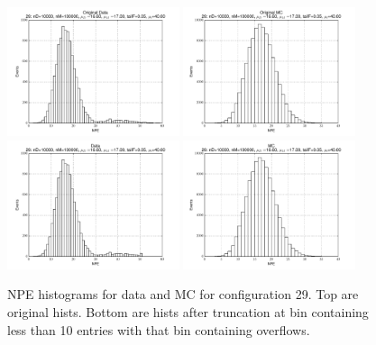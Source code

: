  \begin{figure}[htbp] \begin{center} 
\includegraphics[width=0.45\textwidth]{../FIGURES/29/FIG_Original_Data.pdf} 
\includegraphics[width=0.45\textwidth]{../FIGURES/29/FIG_Original_MC.pdf} 
\includegraphics[width=0.45\textwidth]{../FIGURES/29/FIG_Data.pdf} 
\includegraphics[width=0.45\textwidth]{../FIGURES/29/FIG_MC.pdf} 
\caption{NPE histograms for data and MC for configuration 29. Top are original hists. Bottom are hists after truncation at bin containing less than 10 entries with that bin containing overflows.} 
\label{tab:npe_29} 
\end{center} \end{figure} 

 